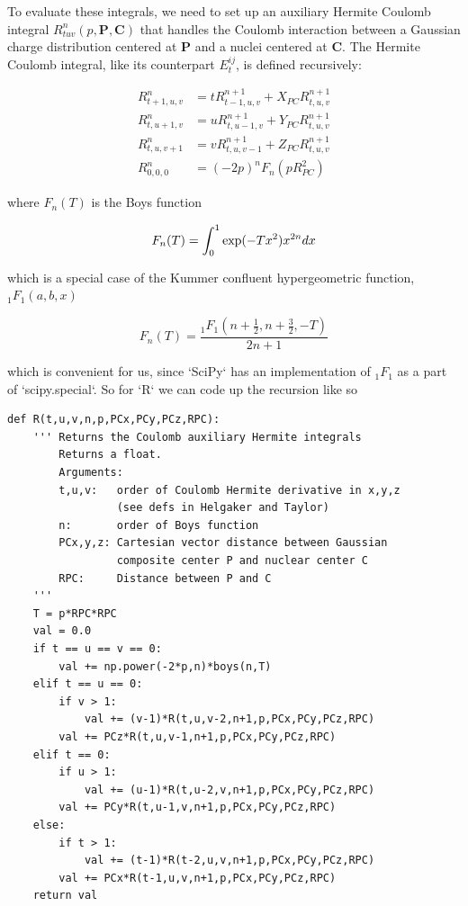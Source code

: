 To evaluate these integrals, we need to set up an auxiliary Hermite
Coulomb integral $R^n_{tuv}(p,\mathbf{P},\mathbf{C})$ that handles the
Coulomb interaction between a Gaussian charge distribution centered at
$\mathbf{P}$ and a nuclei centered at $\mathbf{C}$. The Hermite Coulomb
integral, like its counterpart $E_t^{ij}$, is defined recursively:

\begin{align}
  R^{n}_{t+1,u,v} &= t R^{n+1}_{t-1,u,v} + X_{PC}R^{n+1}_{t,u,v} \\
  R^{n}_{t,u+1,v} &= u R^{n+1}_{t,u-1,v} + Y_{PC}R^{n+1}_{t,u,v} \\
  R^{n}_{t,u,v+1} &= v R^{n+1}_{t,u,v-1} + Z_{PC}R^{n+1}_{t,u,v} \\
  R^{n}_{0,0,0}   &= (-2p)^n F_n (p R_{PC}^2)
\end{align}

where $F_n(T)$ is the Boys function

\begin{equation}
  F_n(T) 
  = 
  \int_0^1 \hbox{exp}(-Tx^2)x^{2n}dx
\end{equation}

which is a special case of the Kummer confluent hypergeometric function, $_1F_1(a,b,x)$

\begin{equation}
  F_n(T) 
  = 
  \frac{_1F_1(n+\frac{1}{2}, n+\frac{3}{2}, -T)}{2n+1}
\end{equation}

 which is convenient for us, since `SciPy` has an implementation of $_1F_1$ as
a part of `scipy.special`. So for `R` we can code up the recursion like
so

\begin{lstlisting}[style=MyPython]
def R(t,u,v,n,p,PCx,PCy,PCz,RPC):
    ''' Returns the Coulomb auxiliary Hermite integrals 
        Returns a float.
        Arguments:
        t,u,v:   order of Coulomb Hermite derivative in x,y,z
                 (see defs in Helgaker and Taylor)
        n:       order of Boys function 
        PCx,y,z: Cartesian vector distance between Gaussian 
                 composite center P and nuclear center C
        RPC:     Distance between P and C
    '''
    T = p*RPC*RPC
    val = 0.0
    if t == u == v == 0:
        val += np.power(-2*p,n)*boys(n,T)
    elif t == u == 0:
        if v > 1:
            val += (v-1)*R(t,u,v-2,n+1,p,PCx,PCy,PCz,RPC)
        val += PCz*R(t,u,v-1,n+1,p,PCx,PCy,PCz,RPC)
    elif t == 0:
        if u > 1:
            val += (u-1)*R(t,u-2,v,n+1,p,PCx,PCy,PCz,RPC)
        val += PCy*R(t,u-1,v,n+1,p,PCx,PCy,PCz,RPC)
    else:
        if t > 1:
            val += (t-1)*R(t-2,u,v,n+1,p,PCx,PCy,PCz,RPC)
        val += PCx*R(t-1,u,v,n+1,p,PCx,PCy,PCz,RPC)
    return val
\end{lstlisting}

